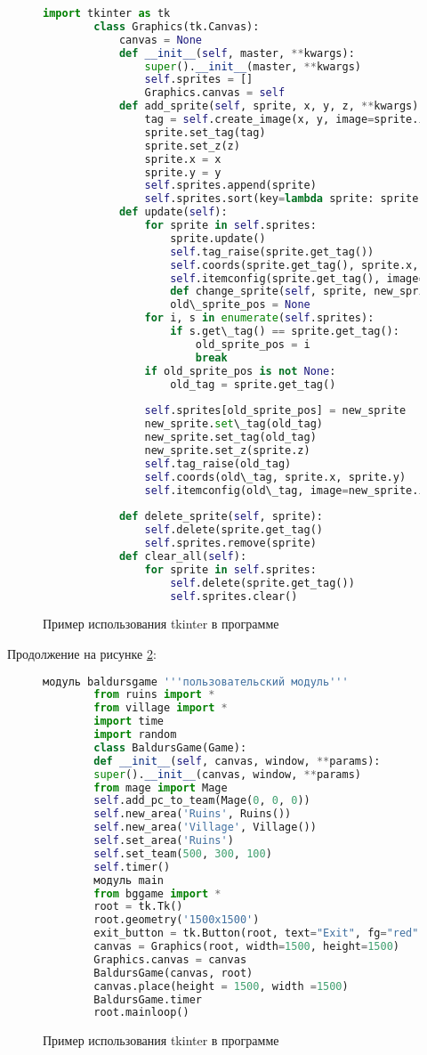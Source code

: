 \begin{figure}[H]
	\begin{lstlisting}[language=Python]
		import tkinter as tk
		class Graphics(tk.Canvas):
			canvas = None
			def __init__(self, master, **kwargs):
				super().__init__(master, **kwargs)
				self.sprites = []
				Graphics.canvas = self			
			def add_sprite(self, sprite, x, y, z, **kwargs):
				tag = self.create_image(x, y, image=sprite.image, anchor='center', **kwargs)
				sprite.set_tag(tag)
				sprite.set_z(z)
				sprite.x = x
				sprite.y = y
				self.sprites.append(sprite)
				self.sprites.sort(key=lambda sprite: sprite.z)
			def update(self):
				for sprite in self.sprites:
					sprite.update()
					self.tag_raise(sprite.get_tag())
					self.coords(sprite.get_tag(), sprite.x, sprite.y)
					self.itemconfig(sprite.get_tag(), image=sprite.image)
					def change_sprite(self, sprite, new_sprite):
					old\_sprite_pos = None
				for i, s in enumerate(self.sprites):
					if s.get\_tag() == sprite.get_tag():
						old_sprite_pos = i
						break
				if old_sprite_pos is not None:
					old_tag = sprite.get_tag()
			
				self.sprites[old_sprite_pos] = new_sprite
				new_sprite.set\_tag(old_tag)
				new_sprite.set_tag(old_tag)
				new_sprite.set_z(sprite.z)
				self.tag_raise(old_tag)
				self.coords(old\_tag, sprite.x, sprite.y)
				self.itemconfig(old\_tag, image=new_sprite.image)
			
			def delete_sprite(self, sprite):
				self.delete(sprite.get_tag()
				self.sprites.remove(sprite)
			def clear_all(self):	
				for sprite in self.sprites:
					self.delete(sprite.get_tag())
					self.sprites.clear()
	\end{lstlisting}  
	\caption{Пример использования tkinter в программе}
	\label{tkinter2:image}
\end{figure}


Продолжение на рисунке \ref{tkinter3:image}:
\begin{figure}[H]
	\begin{lstlisting}[language=Python]
		модуль baldursgame '''пользовательский модуль'''
		from ruins import *
		from village import *
		import time
		import random
		class BaldursGame(Game):
		def __init__(self, canvas, window, **params):
		super().__init__(canvas, window, **params)
		from mage import Mage
		self.add_pc_to_team(Mage(0, 0, 0))
		self.new_area('Ruins', Ruins())
		self.new_area('Village', Village())
		self.set_area('Ruins')
		self.set_team(500, 300, 100)
		self.timer()
		модуль main
		from bggame import *
		root = tk.Tk()
		root.geometry('1500x1500')
		exit_button = tk.Button(root, text="Exit", fg="red", command=root.destroy)
		canvas = Graphics(root, width=1500, height=1500)
		Graphics.canvas = canvas
		BaldursGame(canvas, root)
		canvas.place(height = 1500, width =1500)
		BaldursGame.timer
		root.mainloop()
	\end{lstlisting}  
	\caption{Пример использования tkinter в программе}
	\label{tkinter3:image}
\end{figure}
	
